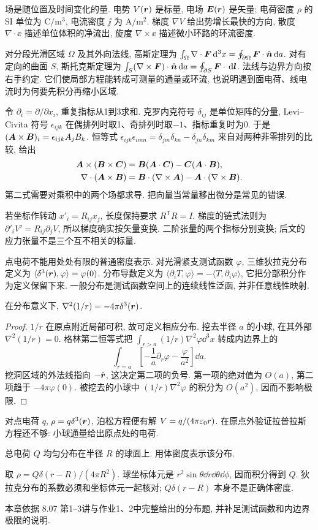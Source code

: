 场是随位置及时间变化的量. 电势 $V(\boldsymbol{r})$ 是标量, 电场 $\boldsymbol{E}(\boldsymbol{r})$ 是矢量; 电荷密度 $\rho$ 的 SI 单位为 $\mathrm{C/m^3}$, 电流密度 $\jj$ 为 $\mathrm{A/m^2}$. 梯度 $\nabla V$ 给出势增长最快的方向, 散度 $\nabla\cdot\ee$ 描述单位体积的净流出, 旋度 $\nabla\times\ee$ 描述微小环路的环流密度.

对分段光滑区域 $\Omega$ 及其外向法线, 高斯定理为 $\int_\Omega\nabla\cdot\boldsymbol{F}\,\mathrm d^3x=\oint_{\partial\Omega}\boldsymbol{F}\cdot\hat{\boldsymbol{n}}\,\mathrm d a$. 对有定向的曲面 $S$, 斯托克斯定理为 $\int_S(\nabla\times\boldsymbol{F})\cdot\hat{\boldsymbol{n}}\,\mathrm d a=\oint_{\partial S}\boldsymbol{F}\cdot\,\mathrm d\boldsymbol{l}$. 法线与边界方向按右手约定. 它们使局部方程能转成可测量的通量或环流, 也说明遇到面电荷、线电流时为何要先积分再缩小区域.

令 $\partial_i=\partial/\partial x_i$, 重复指标从1到3求和. 克罗内克符号 $\delta_{ij}$ 是单位矩阵的分量, Levi--Civita 符号 $\epsilon_{ijk}$ 在偶排列时取1、奇排列时取$-1$、指标重复时为0. 于是 $(\boldsymbol{A}\times\boldsymbol{B})_i=\epsilon_{ijk}A_jB_k$. 恒等式 $\epsilon_{ijk}\epsilon_{imn}=\delta_{jm}\delta_{kn}-\delta_{jn}\delta_{km}$ 来自对两种非零排列的比较, 给出
\begin{align*}
\boldsymbol{A}\times(\boldsymbol{B}\times\boldsymbol{C})&=\boldsymbol{B}(\boldsymbol{A}\cdot\boldsymbol{C})-\boldsymbol{C}(\boldsymbol{A}\cdot\boldsymbol{B}),\\
\nabla\cdot(\boldsymbol{A}\times\boldsymbol{B})&=\boldsymbol{B}\cdot(\nabla\times\boldsymbol{A})-\boldsymbol{A}\cdot(\nabla\times\boldsymbol{B}).
\end{align*}
第二式需要对乘积中的两个场都求导. 把向量当常量移出微分是常见的错误.

若坐标作转动 $x'_i=R_{ij}x_j$, 长度保持要求 $R^\mathsf T R=I$. 梯度的链式法则为 $\partial'_i V'=R_{ij}\partial_jV$, 所以梯度确实按矢量变换. 二阶张量的两个指标分别变换; 后文的应力张量不是三个互不相关的标量.

点电荷不能用处处有限的普通密度表示. 对光滑紧支测试函数 $\varphi$, 三维狄拉克分布定义为 $\langle\delta^3(\boldsymbol{r}),\varphi\rangle=\varphi(0)$. 分布导数定义为 $\langle\partial_iT,\varphi\rangle=-\langle T,\partial_i\varphi\rangle$, 它把分部积分作为定义保留下来. 一般分布是测试函数空间上的连续线性泛函, 并非任意线性映射.

\begin{proposition}\label{prop:point}
在分布意义下, $\nabla^2(1/r)=-4\pi\delta^3(\boldsymbol{r})$.
\end{proposition}
\begin{proof}
$1/r$ 在原点附近局部可积, 故可定义相应分布. 挖去半径 $a$ 的小球, 在其外部 $\nabla^2(1/r)=0$. 格林第二恒等式把 $\int_{r>a}(1/r)\nabla^2\varphi\dd^3x$ 转成内边界上的
\[
\int_{r=a}\left[-\frac1a\partial_r\varphi-\frac{\varphi}{a^2}\right]\dd a.
\]
挖洞区域的外法线指向 $-\hat{\boldsymbol{r}}$, 这决定第二项的负号. 第一项的绝对值为 $O(a)$, 第二项趋于 $-4\pi\varphi(0)$. 被挖去的小球中 $(1/r)\nabla^2\varphi$ 的积分为 $O(a^2)$, 因而不影响极限.
\end{proof}
对点电荷 $q$, $\rho=q\delta^3(\boldsymbol{r})$, 泊松方程便有解 $V=q/(4\pi\varepsilon_0 r)$. 在原点外验证拉普拉斯方程还不够: 小球通量给出原点处的电荷.

\begin{example}
总电荷 $Q$ 均匀分布在半径 $R$ 的球面上. 用体密度表示该分布.
\end{example}
\begin{solution}
取 $\rho=Q\delta(r-R)/(4\pi R^2)$. 球坐标体元是 $r^2\sin\theta\dd r\dd\theta\dd\phi$, 因而积分得到 $Q$. 狄拉克分布的系数必须和坐标体元一起核对; $Q\delta(r-R)$ 本身不是正确体密度.
\end{solution}
本章依据 8.07 第1--3讲与作业1、2中完整给出的分布题, 并补足测试函数和内边界极限的说明.
